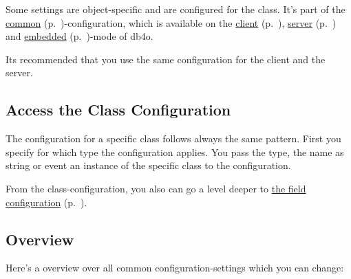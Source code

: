 Some settings are object-specific and are configured for the class. It's part of the \hyperref[ref:configuration-common-configuration]{common} (p.~\pageref{ref:configuration-common-configuration})-configuration, which is available on the \hyperref[ref:configuration-client-configuration]{client} (p.~\pageref{ref:configuration-client-configuration}), \hyperref[ref:configuration-server-configuration]{server} (p.~\pageref{ref:configuration-server-configuration}) and \hyperref[ref:configuration]{embedded} (p.~\pageref{ref:configuration})-mode of db4o.

Its recommended that you use the same configuration for the client and the server.

\subsection*{Access the Class Configuration}

The configuration for a specific class follows always the same pattern. First you specify for which type the configuration applies. You pass the type, the name as string or event an instance of the specific class to the configuration.

From the class-configuration, you also can go a level deeper to \hyperref[ref:configuration-objectfield-configuration]{the field configuration} (p.~\pageref{ref:configuration-objectfield-configuration}).

\subsection*{Overview}

Here's a overview over all common configuration-settings which you can change:

